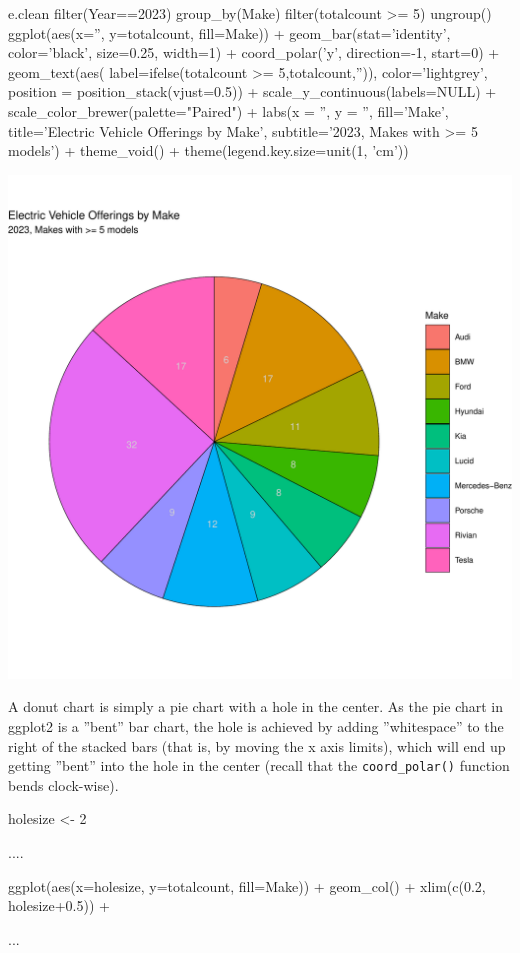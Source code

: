 \begin{samepage}
\begin{Rcode}
e.clean %
  filter(Year==2023) %
  group_by(Make) %
  filter(totalcount >= 5) %
  ungroup() %
ggplot(aes(x='', y=totalcount, fill=Make)) +
  geom_bar(stat='identity', 
           color='black', size=0.25, width=1) + 
  coord_polar('y', direction=-1, start=0) +
  geom_text(aes(
     label=ifelse(totalcount >= 5,totalcount,'')), 
     color='lightgrey', 
     position = position_stack(vjust=0.5)) +
  scale_y_continuous(labels=NULL) + 
  scale_color_brewer(palette="Paired") +
  labs(x = '', y = '',  fill='Make', 
       title='Electric Vehicle Offerings by Make', 
       subtitle='2023, Makes with >= 5 models') +
  theme_void() +
  theme(legend.key.size=unit(1, 'cm'))
\end{Rcode}
\end{samepage}

\begin{center}
  \includegraphics[width=.5\textwidth]{fuel.pie.pdf}
\end{center}

A donut chart is simply a pie chart with a hole in the center. As the pie chart in ggplot2 is a ''bent'' bar chart, the hole is achieved by adding ''whitespace'' to the right of the stacked bars (that is, by moving the x axis limits), which will end up getting ''bent'' into the hole in the center (recall that the \texttt{coord\_polar()} function bends clock-wise).

\begin{samepage}
\begin{Rcode}
holesize <- 2

....

 ggplot(aes(x=holesize, y=totalcount, fill=Make)) +
   geom_col() + 
   xlim(c(0.2, holesize+0.5)) +
     
...

\end{Rcode}
\end{samepage}

